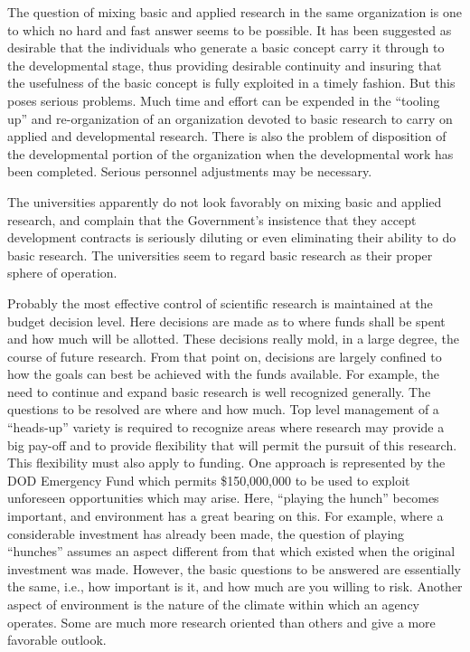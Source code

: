 \documentclass{memoir}
\begin{document}
The question of mixing basic and applied research in the same organization is one to which no hard and fast answer seems to be possible. It has been suggested as desirable that the individuals who generate a basic concept carry it through to the developmental stage, thus providing desirable continuity and insuring that the usefulness of the basic concept is fully exploited in a timely fashion. But this poses serious problems. Much time and effort can be expended in the ``tooling up'' and re-organization of an organization devoted to basic research to carry on applied and developmental research. There is also the problem of disposition of the developmental portion of the organization when the developmental work has been completed. Serious personnel adjustments may be necessary.

The universities apparently do not look favorably on mixing basic and applied research, and complain that the Government's insistence that they accept development contracts is seriously diluting or even eliminating their ability to do basic research. The universities seem to regard basic research as their proper sphere of operation.

Probably the most effective control of scientific research is maintained at the budget decision level. Here decisions are made as to where funds shall be spent and how much will be allotted. These decisions really mold, in a large degree, the course of future research. From that point on, decisions are largely confined to how the goals can best be achieved with the funds available. For example, the need to continue and expand basic research is well recognized generally. The questions to be resolved are where and how much. Top level management of a ``heads-up'' variety is required to recognize areas where research may provide a big pay-off and to provide flexibility that will permit the pursuit of this research. This flexibility must also apply to funding. One approach is represented by the DOD Emergency Fund which permits \$150,000,000 to be used to exploit unforeseen opportunities which may arise. Here, ``playing the hunch'' becomes important, and environment has a great bearing on this. For example, where a considerable investment has already been made, the question of playing ``hunches'' assumes an aspect different from that which existed when the original investment was made. However, the basic questions to be answered are essentially the same, i.e., how important is it, and how much are you willing to risk. Another aspect of environment is the nature of the climate within which an agency operates. Some are much more research oriented than others and give a more favorable outlook.
\end{document}
